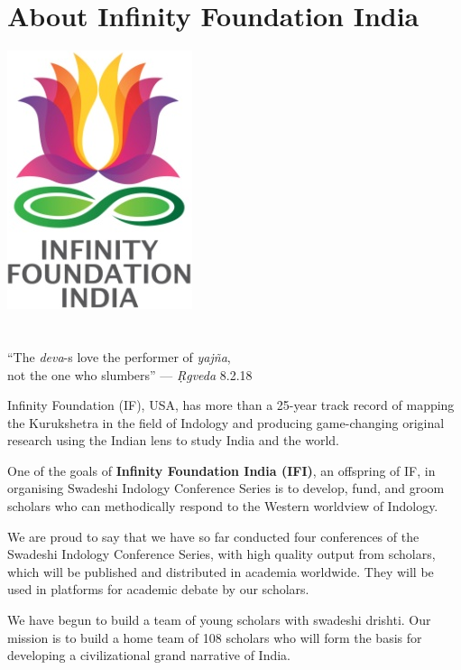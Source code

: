 
\chapter*{About Infinity Foundation India}\label{about}

\begin{center}
 \includegraphics[scale=0.23]{"images/logo.png"}\\\\\\
 “The \textit{deva}-s love the performer of \textit{yajña},\\ 
 not the one who slumbers” — \textit{Ṛgveda} 8.2.18
\end{center}

Infinity Foundation (IF), USA, has more than a 25-year track record of mapping the Kurukshetra in the field of Indology and producing game-changing original research using the Indian lens to study India and the world.

One of the goals of \textbf{Infinity Foundation India (IFI)}, an offspring of IF, in organising Swadeshi Indology Conference Series is to develop, fund, and groom scholars who can methodically respond to the Western worldview of Indology.

We are proud to say that we have so far conducted four conferences of the Swadeshi Indology Conference Series, with high quality output from scholars, which will be published and distributed in academia worldwide. They will be used in platforms for academic debate by our scholars.

We have begun to build a team of young scholars with swadeshi drishti. Our mission is to build a home team of 108 scholars who will form the basis for developing a civilizational grand narrative of India.

